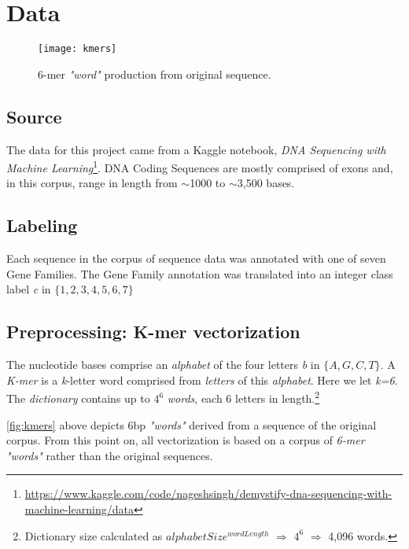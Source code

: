 \section{Data}
%
  \begin{figure}
    \centering
    \texttt{[image: kmers]}
    \caption{%
      6-mer \textit{"word"} production from original sequence.
    }
    \label{fig:kmers}
  \end{figure}
%
\subsection{Source}

The data for this project came from a Kaggle notebook, \textit{DNA Sequencing with Machine Learning}\footnote{\url{https://www.kaggle.com/code/nageshsingh/demystify-dna-sequencing-with-machine-learning/data}}.
%
DNA Coding Sequences are mostly comprised of exons and, in this corpus, range in length from  $\sim$1000 to $\sim$3,500 bases.

\subsection{Labeling}
Each sequence in the corpus of sequence data was annotated with one of seven Gene Families.  The Gene Family annotation was translated into an integer class label \textit{c} in $\{1, 2, 3, 4, 5, 6, 7\}$


\subsection{Preprocessing: K-mer vectorization}
%
The nucleotide bases comprise an \textit{alphabet} of the four letters \textit{b} in $\{A, G, C, T\}$.  A \textit{K-mer} is a \textit{k}-letter word comprised from \textit{letters} of this \textit{alphabet}.  Here we let \textit{k=6}.  The \textit{dictionary} contains up to $4^{6}$ \textit{words}, each 6 letters in length.\footnote{Dictionary size calculated as $alphabetSize^{wordLength}$ $\Rightarrow$ $4^{6}$ $\Rightarrow$ 4,096 words.}

\autoref{fig:kmers} above depicts 6bp \textit{"words"} derived from a sequence of the original corpus.  From this point on, all vectorization is based on a corpus of \textit{6-mer "words"} rather than the original sequences.
%
